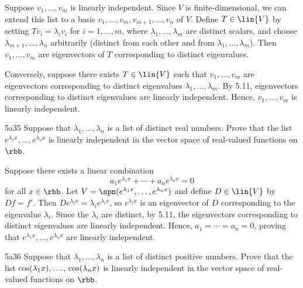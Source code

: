 \begin{sol}
    Suppose $v_1, \ldots, v_m$ is linearly independent.
	Since $V$ is finite-dimensional, we can extend this list to a basis $v_1, \ldots, v_m, v_{m+1}, \ldots, v_n$ of $V$.
	Define $T \in \lin{V}$ by setting $Tv_i = \lambda_i v_i$ for $i = 1, \ldots, m$, where $\lambda_1, \ldots, \lambda_m$ are distinct scalars, and choose $\lambda_{m+1}, \ldots, \lambda_n$ arbitrarily (distinct from each other and from $\lambda_1, \ldots, \lambda_m$).
	Then $v_1, \ldots, v_m$ are eigenvectors of $T$ corresponding to distinct eigenvalues.

    Conversely, suppose there exists $T \in \lin{V}$ such that $v_1, \ldots, v_m$ are eigenvectors corresponding to distinct eigenvalues $\lambda_1, \ldots, \lambda_m$.
	By 5.11, eigenvectors corresponding to distinct eigenvalues are linearly independent.
	Hence, $v_1, \ldots, v_m$ is linearly independent.
\end{sol}

\begin{exercise}{5a35}
    Suppose that $\lambda_1, \ldots, \lambda_n$ is a list of distinct real numbers.
	Prove that the list $e^{\lambda_1 x}, \ldots, e^{\lambda_n x}$ is linearly independent in the vector space of real-valued functions on $\rbb$.
    
\end{exercise}

\begin{sol}
    Suppose there exists a linear combination
    \[
    	a_1 e^{\lambda_1 x} + \cdots + a_n e^{\lambda_n x} = 0
    \]
    for all $x \in \rbb$.
	Let $V = \spn(e^{\lambda_1 x}, \ldots, e^{\lambda_n x})$ and define $D \in \lin{V}$ by $Df = f'$.
	Then $De^{\lambda_i x} = \lambda_i e^{\lambda_i x}$, so $e^{\lambda_i x}$ is an eigenvector of $D$ corresponding to the eigenvalue $\lambda_i$.
	Since the $\lambda_i$ are distinct, by 5.11, the eigenvectors corresponding to distinct eigenvalues are linearly independent.
	Hence, $a_1 = \cdots = a_n = 0$, proving that $e^{\lambda_1 x}, \ldots, e^{\lambda_n x}$ are linearly independent.
\end{sol}

\begin{exercise}{5a36}
    Suppose that $\lambda_1, \ldots, \lambda_n$ is a list of distinct positive numbers.
	Prove that the list $\cos(\lambda_1 x), \ldots, \\ \cos(\lambda_n x)$ is linearly independent in the vector space of real-valued functions on $\rbb$.
\end{exercise}

